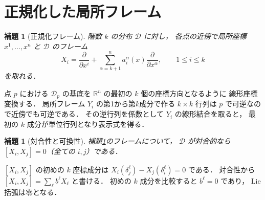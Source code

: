 \documentclass[a5paper,10pt,onecolumn]{jsarticle}
\makeatletter
\theoremstyle{mathnotetheorem}
\newtheorem{lemma}[theorem]{補題}
\renewcommand{\proofname}{証明}
\renewenvironment{proof}[1][\proofname]{%
  \par\pushQED{\qed}\normalfont\topsep4\p@\@plus2\p@\relax
  \trivlist\item[\hskip\labelsep\bfseries #1]\ignorespaces
}{\popQED\endtrivlist\@endpefalse}
\makeatother
\begin{document}
\section{正規化した局所フレーム}
\begin{lemma}[正規化フレーム]\label{lem:normalframe}
階数 $k$ の分布 $\mathcal D$ に対し，
各点の近傍で局所座標 $x^1,\dots,x^n$ と
$\mathcal D$ のフレーム
\[
 X_i=\frac{\partial}{\partial x^i}
 +\sum_{\alpha=k+1}^n a_i^\alpha(x)
 \frac{\partial}{\partial x^\alpha},
 \qquad 1\le i\le k
\]
を取れる．
\end{lemma}
\begin{proof}
点 $p$ における $\mathcal D_p$ の基底を
$\mathbb R^n$ の最初の $k$ 個の座標方向となるように
線形座標変換する．
局所フレーム $Y_i$ の第1から第$k$成分で作る
$k\times k$ 行列は $p$ で可逆なので近傍でも可逆である．
その逆行列を係数として $Y_i$ の線形結合を取ると，
最初の $k$ 成分が単位行列となり表示式を得る．
\end{proof}
\begin{lemma}[対合性と可換性]\label{lem:commuting}
補題\ref{lem:normalframe}のフレームについて，
$\mathcal D$ が対合的なら
$[X_i,X_j]=0$（全ての $i,j$）である．
\end{lemma}
\begin{proof}
$[X_i,X_j]$ の初めの $k$ 座標成分は
$X_i(\delta_j^\ell)-X_j(\delta_i^\ell)=0$ である．
対合性から $[X_i,X_j]=\sum_\ell b^\ell X_\ell$ と書ける．
初めの $k$ 成分を比較すると $b^\ell=0$ であり，
Lie括弧は零となる．
\end{proof}
\end{document}
